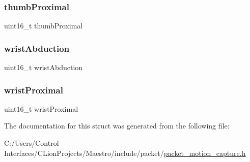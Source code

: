 \subsubsection{\texorpdfstring{thumb\+Proximal}{thumbProximal}}
{\footnotesize\ttfamily uint16\+\_\+t thumb\+Proximal}

\mbox{\label{struct_phalange_displacements_reply_aa161a47616792dfde39295782d039c0c}} 
\subsubsection{\texorpdfstring{wrist\+Abduction}{wristAbduction}}
{\footnotesize\ttfamily uint16\+\_\+t wrist\+Abduction}

\mbox{\label{struct_phalange_displacements_reply_a81aac7724e759c0739ff83925f92be36}} 
\subsubsection{\texorpdfstring{wrist\+Proximal}{wristProximal}}
{\footnotesize\ttfamily uint16\+\_\+t wrist\+Proximal}



The documentation for this struct was generated from the following file\+:\begin{DoxyCompactItemize}
\item 
C\+:/\+Users/\+Control Interfaces/\+C\+Lion\+Projects/\+Maestro/include/packet/\hyperlink{packet__motion__capture_8h}{packet\+\_\+motion\+\_\+capture.\+h}\end{DoxyCompactItemize}
